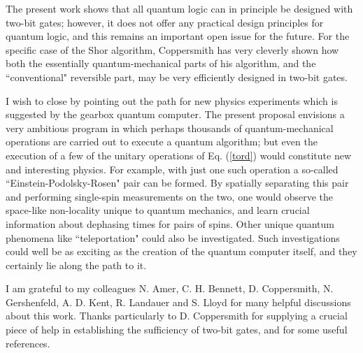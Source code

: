 The present work shows that all quantum logic can in principle be
designed with two-bit gates; however, it does not offer any practical
design principles for quantum logic, and this remains an important
open issue for the future.  For the specific case of the Shor algorithm,
Coppersmith\cite{Copper} has very cleverly shown how both the
essentially quantum-mechanical parts of his algorithm, and the
``conventional" reversible part, may be very efficiently designed in
two-bit gates.

I wish to close by pointing out the path for new physics experiments
which is suggested by the gearbox quantum computer.  The present
proposal envisions a very ambitious program in which perhaps thousands
of quantum-mechanical operations are carried out to execute a quantum
algorithm; but even the execution of a few of the unitary operations of
Eq. (\ref{tord}) would constitute new and interesting physics.  For example,
with just one such operation a so-called
``Einstein-Podolsky-Rosen" pair\cite{Perez}
can be formed.  By spatially separating
this pair and performing single-spin measurements on the two, one would
observe the space-like non-locality unique to quantum mechanics, and
learn crucial information about dephasing times for pairs of spins.
Other unique quantum phenomena like ``teleportation"\cite{Tel} could
also be investigated.  Such investigations could well be as exciting
as the creation of the quantum computer itself, and they certainly
lie along the path to it.

\acknowledgments

I am grateful to my colleagues N. Amer, C. H. Bennett, D. Coppersmith,
N. Gershenfeld,
A. D. Kent, R. Landauer and S. Lloyd for many helpful discussions about this
work.  Thanks particularly to D. Coppersmith for supplying a crucial
piece of help in establishing the sufficiency of two-bit gates, and
for some useful references.

